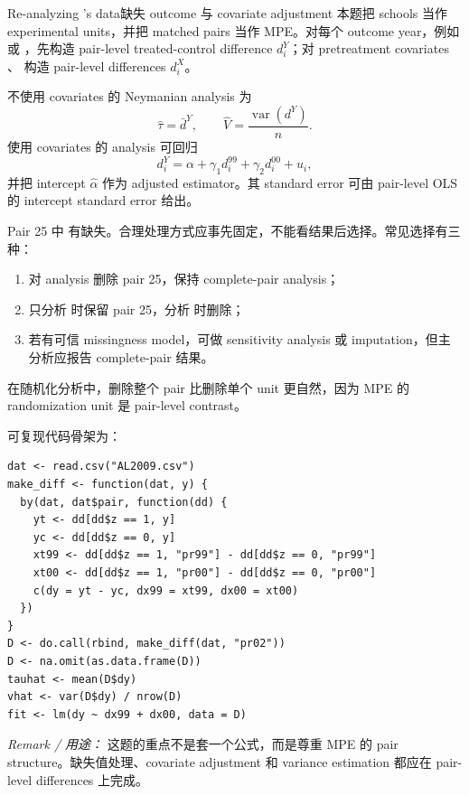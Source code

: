 \begin{exercisesolution}{Re-analyzing \citet{angrist2009effects}'s data}{缺失 outcome 与 covariate adjustment}
本题把 schools 当作 experimental units，并把 matched pairs 当作 MPE。对每个 outcome year，例如  或 ，先构造 pair-level treated-control difference $d^Y_i$；对 pretreatment covariates 、 构造 pair-level differences $d^X_i$。

不使用 covariates 的 Neymanian analysis 为
\[
\hat\tau=\bar d^Y,\qquad
\hat V=\frac{\operatorname{var}(d^Y)}{n}.
\]
使用 covariates 的 analysis 可回归
\[
d^Y_i=\alpha+\gamma_1d^{99}_i+\gamma_2d^{00}_i+u_i,
\]
并把 intercept $\hat\alpha$ 作为 adjusted estimator。其 standard error 可由 pair-level OLS 的 intercept standard error 给出。

Pair 25 中  有缺失。合理处理方式应事先固定，不能看结果后选择。常见选择有三种：
\begin{enumerate}
\item 对  analysis 删除 pair 25，保持 complete-pair analysis；
\item 只分析  时保留 pair 25，分析  时删除；
\item 若有可信 missingness model，可做 sensitivity analysis 或 imputation，但主分析应报告 complete-pair 结果。
\end{enumerate}
在随机化分析中，删除整个 pair 比删除单个 unit 更自然，因为 MPE 的 randomization unit 是 pair-level contrast。

可复现代码骨架为：
\begin{lstlisting}
dat <- read.csv("AL2009.csv")
make_diff <- function(dat, y) {
  by(dat, dat$pair, function(dd) {
    yt <- dd[dd$z == 1, y]
    yc <- dd[dd$z == 0, y]
    xt99 <- dd[dd$z == 1, "pr99"] - dd[dd$z == 0, "pr99"]
    xt00 <- dd[dd$z == 1, "pr00"] - dd[dd$z == 0, "pr00"]
    c(dy = yt - yc, dx99 = xt99, dx00 = xt00)
  })
}
D <- do.call(rbind, make_diff(dat, "pr02"))
D <- na.omit(as.data.frame(D))
tauhat <- mean(D$dy)
vhat <- var(D$dy) / nrow(D)
fit <- lm(dy ~ dx99 + dx00, data = D)
\end{lstlisting}

\emph{Remark / 用途：} 这题的重点不是套一个公式，而是尊重 MPE 的 pair structure。缺失值处理、covariate adjustment 和 variance estimation 都应在 pair-level differences 上完成。
\end{exercisesolution}

